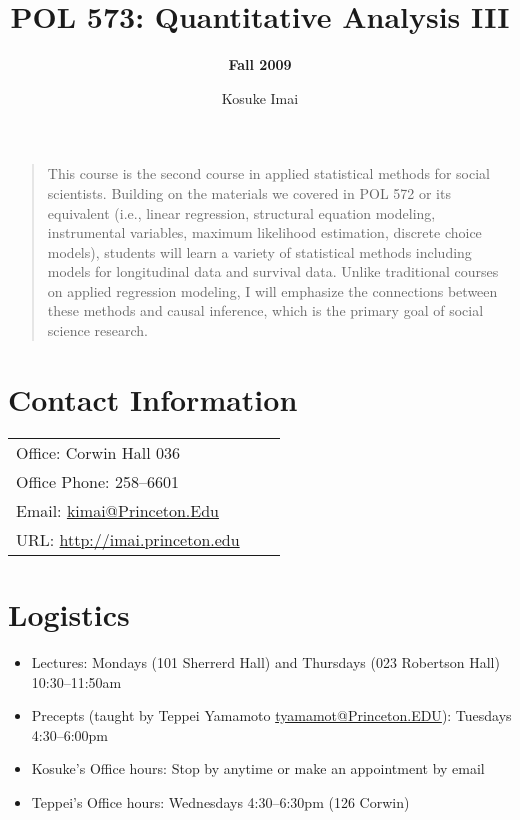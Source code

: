 \documentclass[11pt]{article}
\title{\bf POL 573: Quantitative Analysis III}
\author{\Large {\bf Fall 2009}}
\date{Kosuke Imai}
\begin{document}
\maketitle

\begin{quote}
  This course is the second course in applied statistical methods for
  social scientists. Building on the materials we covered in POL 572
  or its equivalent (i.e., linear regression, structural equation
  modeling, instrumental variables, maximum likelihood estimation,
  discrete choice models), students will learn a variety of
  statistical methods including models for longitudinal data and
  survival data. Unlike traditional courses on applied regression
  modeling, I will emphasize the connections between these methods and
  causal inference, which is the primary goal of social science
  research.
\end{quote}

\section{Contact Information}

\begin{flushleft}
\begin{tabular}{lcl}
Office: Corwin Hall 036\\
Office Phone: 258--6601 \\
Email: \href{mailto:kimai@Princeton.Edu}{kimai@Princeton.Edu} \\
URL: \href{http://imai.princeton.edu}{http://imai.princeton.edu}\\
\end{tabular}
\end{flushleft}

\section{Logistics}

\begin{itemize}
\item Lectures: Mondays (101 Sherrerd Hall) and Thursdays (023
  Robertson Hall) 10:30--11:50am

\item Precepts (taught by Teppei Yamamoto
  \href{mailto:tyamamot@Princeton.EDU}{tyamamot@Princeton.EDU}): Tuesdays 4:30--6:00pm

\item Kosuke's Office hours: Stop by anytime or make an appointment by email

\item Teppei's Office hours: Wednesdays 4:30--6:30pm (126 Corwin)
\end{itemize}
\end{document}
